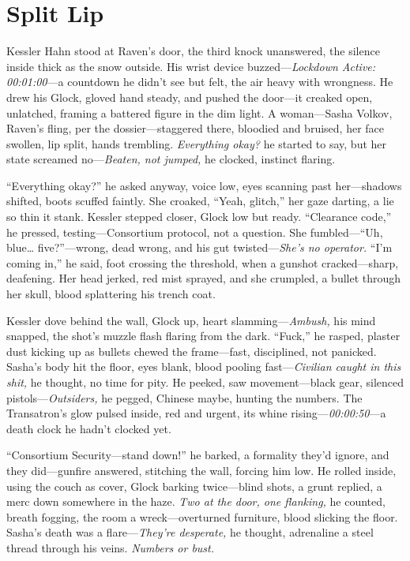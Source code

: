 \documentclass[12pt]{book}
\begin{document}
\section{Split Lip}

Kessler Hahn stood at Raven’s door, the third knock unanswered, the silence inside thick as the snow outside. His wrist device buzzed—\textit{Lockdown Active: 00:01:00}—a countdown he didn’t see but felt, the air heavy with wrongness. He drew his Glock, gloved hand steady, and pushed the door—it creaked open, unlatched, framing a battered figure in the dim light. A woman—Sasha Volkov, Raven’s fling, per the dossier—staggered there, bloodied and bruised, her face swollen, lip split, hands trembling. \textit{Everything okay?} he started to say, but her state screamed no—\textit{Beaten, not jumped,} he clocked, instinct flaring.

“Everything okay?” he asked anyway, voice low, eyes scanning past her—shadows shifted, boots scuffed faintly. She croaked, “Yeah, glitch,” her gaze darting, a lie so thin it stank. Kessler stepped closer, Glock low but ready. “Clearance code,” he pressed, testing—Consortium protocol, not a question. She fumbled—“Uh, blue… five?”—wrong, dead wrong, and his gut twisted—\textit{She’s no operator.} “I’m coming in,” he said, foot crossing the threshold, when a gunshot cracked—sharp, deafening. Her head jerked, red mist sprayed, and she crumpled, a bullet through her skull, blood splattering his trench coat.

Kessler dove behind the wall, Glock up, heart slamming—\textit{Ambush,} his mind snapped, the shot’s muzzle flash flaring from the dark. “Fuck,” he rasped, plaster dust kicking up as bullets chewed the frame—fast, disciplined, not panicked. Sasha’s body hit the floor, eyes blank, blood pooling fast—\textit{Civilian caught in this shit,} he thought, no time for pity. He peeked, saw movement—black gear, silenced pistols—\textit{Outsiders,} he pegged, Chinese maybe, hunting the numbers. The Transatron’s glow pulsed inside, red and urgent, its whine rising—\textit{00:00:50}—a death clock he hadn’t clocked yet.

“Consortium Security—stand down!” he barked, a formality they’d ignore, and they did—gunfire answered, stitching the wall, forcing him low. He rolled inside, using the couch as cover, Glock barking twice—blind shots, a grunt replied, a merc down somewhere in the haze. \textit{Two at the door, one flanking,} he counted, breath fogging, the room a wreck—overturned furniture, blood slicking the floor. Sasha’s death was a flare—\textit{They’re desperate,} he thought, adrenaline a steel thread through his veins. \textit{Numbers or bust.}
\end{document}
